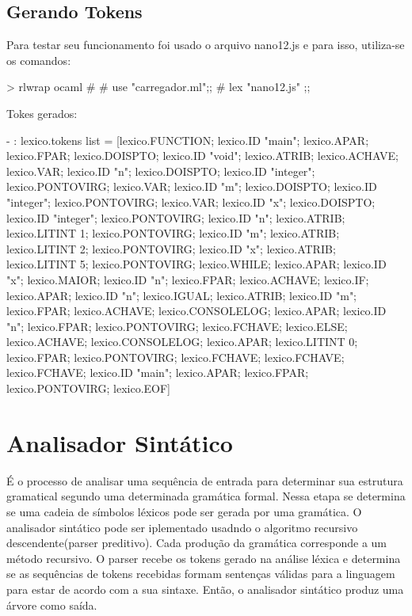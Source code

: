 \documentclass[12pt,a4paper,twoside]{article}
\begin{document}
\subsection{Gerando Tokens}
Para testar seu funcionamento foi usado o arquivo nano12.js e para isso, utiliza-se os comandos:
\begin{terminal}
    > rlwrap ocaml
    # # use "carregador.ml";;
    # lex "nano12.js" ;;
\end{terminal}
Tokes gerados:
\begin{terminal}
- : lexico.tokens list =
[lexico.FUNCTION; lexico.ID "main"; lexico.APAR; lexico.FPAR;
 lexico.DOISPTO; lexico.ID "void"; lexico.ATRIB; lexico.ACHAVE;
 lexico.VAR; lexico.ID "n"; lexico.DOISPTO; lexico.ID "integer";
 lexico.PONTOVIRG; lexico.VAR; lexico.ID "m"; lexico.DOISPTO;
 lexico.ID "integer"; lexico.PONTOVIRG; lexico.VAR; lexico.ID "x";
 lexico.DOISPTO; lexico.ID "integer"; lexico.PONTOVIRG;
 lexico.ID "n"; lexico.ATRIB; lexico.LITINT 1; lexico.PONTOVIRG;
 lexico.ID "m"; lexico.ATRIB; lexico.LITINT 2; lexico.PONTOVIRG;
 lexico.ID "x"; lexico.ATRIB; lexico.LITINT 5; lexico.PONTOVIRG;
 lexico.WHILE; lexico.APAR; lexico.ID "x"; lexico.MAIOR;
 lexico.ID "n"; lexico.FPAR; lexico.ACHAVE; lexico.IF; lexico.APAR;
 lexico.ID "n"; lexico.IGUAL; lexico.ATRIB; lexico.ID "m";
 lexico.FPAR; lexico.ACHAVE; lexico.CONSOLELOG; lexico.APAR;
 lexico.ID "n"; lexico.FPAR; lexico.PONTOVIRG; lexico.FCHAVE;
 lexico.ELSE; lexico.ACHAVE; lexico.CONSOLELOG; lexico.APAR;
 lexico.LITINT 0; lexico.FPAR; lexico.PONTOVIRG; lexico.FCHAVE;
 lexico.FCHAVE; lexico.FCHAVE; lexico.ID "main"; lexico.APAR;
 lexico.FPAR; lexico.PONTOVIRG; lexico.EOF]
\end{terminal}

\section{Analisador Sintático}
É o processo de analisar uma sequência de entrada para determinar sua estrutura gramatical segundo uma determinada gramática formal. Nessa etapa se determina se uma cadeia de símbolos léxicos pode ser gerada por uma gramática.
O analisador sintático pode ser iplementado usadndo o algoritmo recursivo descendente(parser preditivo). Cada produção da gramática corresponde a um método recursivo.\newline
O parser recebe os tokens gerado na análise léxica e determina se as sequências de tokens recebidas formam sentenças válidas para a linguagem para estar de acordo com a sua sintaxe. Então, o analisador sintático produz uma árvore como saída.
\end{document}
